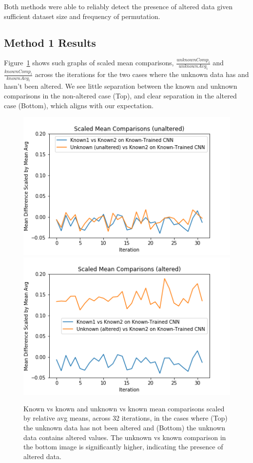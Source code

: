\documentclass{acm_proc_article-sp}
\begin{document}
  Both methods were able to reliably detect the presence of altered data given sufficient dataset size and frequency of permutation.

  \subsection{Method 1 Results}
  \label{subsec:method1results}

  Figure~\ref{fig.scaledmeancomp-NN} shows such graphs of scaled mean comparisons, $\frac{unknownComp_{i}}{unknownAvg_{i}}$ and $\frac{knownComp_{i}}{knownAvg_{i}}$ across the iterations for the two cases where the unknown data has and hasn't been altered. We see little separation between the known and unknown comparisons in the non-altered case (Top), and clear separation in the altered case (Bottom), which aligns with our expectation.

  \begin{figure}[h]
    \centering
    \includegraphics[width=0.8\columnwidth]{images/SMC-rvnNN-nvnNN-unalt.png}
    \includegraphics[width=0.8\columnwidth]{images/SMC-rvnNN-nvnNN-alt.png}
    \caption{Known vs known and unknown vs known mean comparisons scaled by relative avg means, across 32 iterations, in the cases where (Top) the unknown data has not been altered and (Bottom) the unknown data contains altered values. The unknown vs known comparison in the bottom image is significantly higher, indicating the presence of altered data.}
    \label{fig.scaledmeancomp-NN}
    \end{figure}
  
\end{document}

